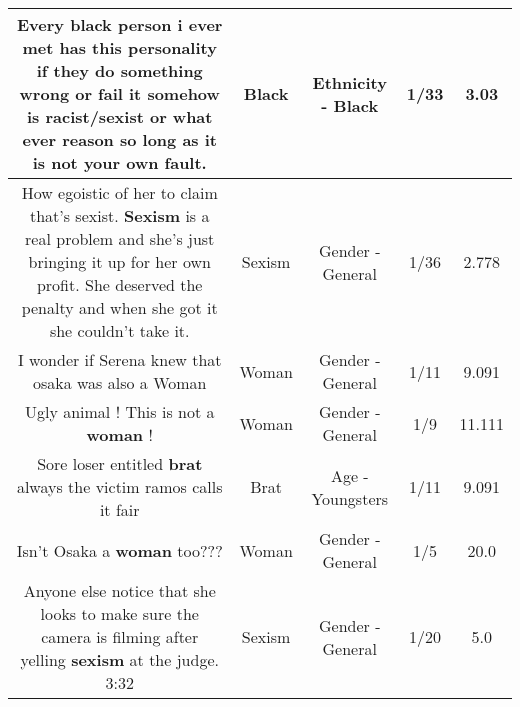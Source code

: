 \documentclass[11pt]{article}
\newlength\mylength
\begin{document}
\begin{center}
\begin{longtable}{|C{.65\mylength}|C{.30\mylength}|C{.12\mylength}|C{.12\mylength}|C{.12\mylength}|}
  \small Every \textbf{black} person i ever met has this personality if they do something wrong or fail it somehow is racist/sexist or what ever reason so long as it is not your own fault.\normalsize   & Black & Ethnicity - Black & 1/33 & 3.03 \\  \hline
  \small How egoistic of her to claim that's sexist. \textbf{Sexism} is a real problem and she's just bringing it up for her own profit. She deserved the penalty and when she got it she couldn't take it.\normalsize   & Sexism & Gender - General & 1/36 & 2.778 \\  \hline
  \small I wonder if Serena knew that osaka was also a Woman\normalsize   & Woman & Gender - General & 1/11 & 9.091 \\  \hline
  \small Ugly animal ! This is not a \textbf{woman} !\normalsize   & Woman & Gender - General & 1/9 & 11.111 \\  \hline
  \small Sore loser entitled \textbf{brat} always the victim ramos calls it fair\normalsize   & Brat & Age - Youngsters & 1/11 & 9.091 \\  \hline
  \small Isn't Osaka a \textbf{woman} too???\normalsize   & Woman & Gender - General & 1/5 & 20.0 \\  \hline
  \small Anyone else notice that she looks to make sure the camera is filming after yelling \textbf{sexism} at the judge. 3:32\normalsize   & Sexism & Gender - General & 1/20 & 5.0 \\  \hline

\end{longtable}
\end{center}
\end{document}
